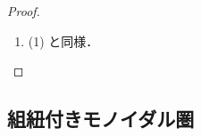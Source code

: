 \documentclass[TQFT_main]{subfiles}
\begin{document}
\begin{proof}
\begin{enumerate}
\begin{align}
\begin{tikzpicture}[baseline={([yshift=-.5ex]current bounding box.center)}]
                    +(-0.5,1) coordinate[label=left:$Z$] (Z)
                    +(0.5,1) coordinate[label=left:$Y^*$] (Y)
                    ++(1.5,1) coordinate[label=left:$Y$] (W);
                    \draw[->-=.5] (X) -- (g);
                    \draw[->-=.5] (g) -- (Z);
                    \draw[->-=.5] (Y) -- (g);
                    \LEV{Y}{W}
                    \draw[-<-=.5] (W) -- ++(0,-2);
                \end{tikzpicture}
        \end{align}
        である．他も同様．
        \item (1) と同様．
    \end{enumerate}
\end{proof}

\subsection{組紐付きモノイダル圏}
\end{document}
